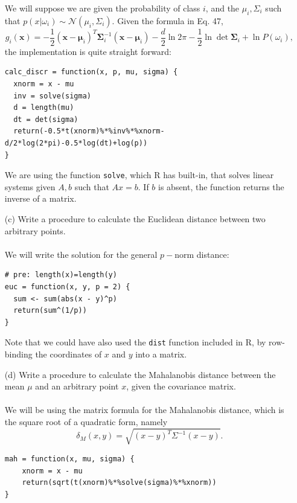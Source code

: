 \documentclass[10pt]{article}
\begin{document}
\begin{enumerate}
\normalsize
        We will suppose we are given the probability of class $i$, and the $\mu_i,\Sigma_i$ such that $p(x|\omega_i)\sim\mathcal N(\mu_i,\Sigma_i)$. Given the formula in Eq. 47,
        \[
g_i(\boldsymbol x)=-\frac{1}{2}(\boldsymbol x-\boldsymbol\mu_i)^T\boldsymbol\Sigma_i^{-1}(\boldsymbol x-\boldsymbol\mu_i)-\frac{d}{2}\ln{2\pi}-\frac{1}{2}\ln{\det{\boldsymbol\Sigma_i}}+\ln{P(\omega_i)},
        \]
        the implementation is quite straight forward:
        \begin{verbatim}
calc_discr = function(x, p, mu, sigma) {
  xnorm = x - mu
  inv = solve(sigma)
  d = length(mu)
  dt = det(sigma)
  return(-0.5*t(xnorm)%*%inv%*%xnorm-d/2*log(2*pi)-0.5*log(dt)+log(p))
}
        \end{verbatim}
        We are using the function \verb|solve|, which R has built-in, that solves linear systems given $A,b$ such that $Ax=b$. If $b$ is absent, the function returns the inverse of a matrix.
\Large
    \item[(c)] Write a procedure to calculate the Euclidean distance between two arbitrary points.\\ \ \\
\normalsize
        We will write the solution for the general $p-$norm distance:
        \begin{verbatim}
# pre: length(x)=length(y)
euc = function(x, y, p = 2) {
  sum <- sum(abs(x - y)^p)
  return(sum^(1/p))
}
        \end{verbatim}
        Note that we could have also used the \verb|dist| function included in R, by row-binding the coordinates of $x$ and $y$ into a matrix.\\
        
\Large
    \item[(d)] Write a procedure to calculate the Mahalanobis distance between the mean $\mu$ and an arbitrary point $x$, given the covariance matrix.\\ \ \\
\normalsize
        We will be using the matrix formula for the Mahalanobis distance, which is the square root of a quadratic form, namely
        \[
        \delta_M(x,y)=\sqrt{(x-y)^T\Sigma^{-1}(x-y)}.
        \]
        \begin{verbatim}
mah = function(x, mu, sigma) {
    xnorm = x - mu
    return(sqrt(t(xnorm)%*%solve(sigma)%*%xnorm))
}
        \end{verbatim}
  \end{enumerate}
\end{document}
